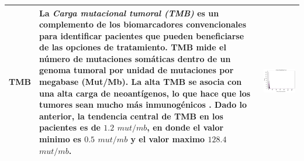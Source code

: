 \begin{table}[!htb]
	\footnotesize
	\begin{threeparttable}
		\begin{tabular}{p{2.5cm} p{7cm} p{6.5cm}} \toprule	
			
			TMB
			& La \textit{Carga mutacional tumoral (TMB)} es un complemento de los biomarcadores convencionales para identificar pacientes que pueden beneficiarse de las opciones de tratamiento. TMB mide el número de mutaciones somáticas dentro de un genoma tumoral por unidad de mutaciones por megabase (Mut/Mb). La alta TMB se asocia con una alta carga de neoantígenos, lo que hace que los tumores sean mucho más inmunogénicos \cite{Ke2022}. Dado lo anterior, la tendencia central de TMB en los pacientes es de $1.2$ $mut/mb$, en donde el valor minimo es $0.5$ $mut/mb$ y el valor maximo $128.4$ $mut/mb$.
			
			& \begin{center}\includegraphics[width=1\linewidth]{NOTEBOOK/IMAGENES_DESCRIPTIVAS/42_tmb_nonsynonymous}\end{center}
			\\ \hline
			

\end{tabular}
\end{threeparttable}
\end{table}
